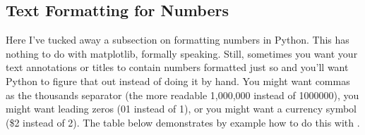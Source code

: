 



\subsection{Text Formatting for Numbers}\label{subsec:textformat}
Here I've tucked away a subsection on formatting numbers in Python. This has nothing to do with matplotlib, formally speaking. Still, sometimes you want your text annotations or titles to contain numbers formatted just so and you'll want Python to figure that out instead of doing it by hand. You might want commas as the thousands separator (the more readable 1,000,000 instead of 1000000), you might want leading zeros (01 instead of 1), or you might want a currency symbol (\$2 instead of 2). The table below demonstrates by example how to do this with .

